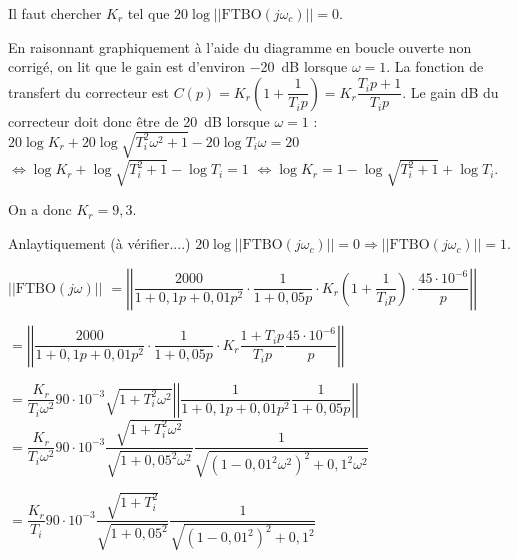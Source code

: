 \begin{multicols}{2}
\begin{corrige}
\end{corrige}
\else
\fi



\begin{methode}
Il faut chercher $K_r$ tel que $20\log||\text{FTBO}(j\omega_c)||=0$.
\end{methode}
\ifprof


\ifprof
\begin{corrige}
En raisonnant graphiquement à l'aide du diagramme en boucle ouverte non corrigé, on lit que le gain est d'environ \SI{-20}{dB} lorsque $\omega=1$. La fonction de transfert du correcteur est 
$C(p)=K_r  \left(1+\dfrac{1}{T_i p} \right)=K_r  \dfrac{T_i p+1}{T_i p} $. Le gain dB du correcteur doit donc être de \SI{20}{dB} lorsque $\omega=1$ :
$20\log K_r  +20\log \sqrt{T_i^2 \omega^2 + 1}- 20\log T_i \omega =20$
$\Leftrightarrow \log K_r  +\log \sqrt{T_i^2  + 1}- \log T_i  =1$
$\Leftrightarrow \log K_r   =1-\log \sqrt{T_i^2  + 1}+ \log T_i $. 

On a donc $K_r = 9,3$. 

\vspace{1cm}
Anlaytiquement (à vérifier....)
$20\log||\text{FTBO}(j\omega_c)||=0 \Rightarrow ||\text{FTBO}(j\omega_c)||=1$.

$\left|\left| \text{FTBO}\left( j \omega\right)\right|\right|$ 
$ = \left|\left|
{\dfrac{2000}{1+0,1p+0,01p^2}}
\cdot
{\dfrac{1}{1+0,05p}}
\cdot 
{K_r}
 \left(1+\dfrac{1}{T_i p} \right) \cdot 
\dfrac{45\cdot 10^{-6}}{p}
\right|\right| $

$ = \left|\left|
{\dfrac{2000}{1+0,1p+0,01p^2}}
\cdot
{\dfrac{1}{1+0,05p}}
\cdot 
{K_r}
 \dfrac{1+T_i p}{T_i p} 
\dfrac{45\cdot 10^{-6}}{p}
\right|\right| $

$ =  \dfrac{K_r}{T_i\omega^2}  90\cdot 10^{-3}  \sqrt{1+T_i^2\omega^2}\left|\left|
\dfrac{1}{1+0,1p+0,01p^2}
\dfrac{1}{1+0,05p}
\right|\right| $
$ =  \dfrac{K_r}{T_i\omega^2}  90\cdot 10^{-3}  
\dfrac{\sqrt{1+T_i^2\omega^2}}{\sqrt{1+0,05^2 \omega^2}}
\dfrac{1}{\sqrt{\left(1-0,01^2\omega^2\right)^2+0,1^2\omega^2}} $

$ =  \dfrac{K_r}{T_i}  90\cdot 10^{-3}  
\dfrac{\sqrt{1+T_i^2}}{\sqrt{1+0,05^2 }}
\dfrac{1}{\sqrt{\left(1-0,01^2\right)^2+0,1^2}} $

\end{corrige}
\else
\fi



\end{multicols}
